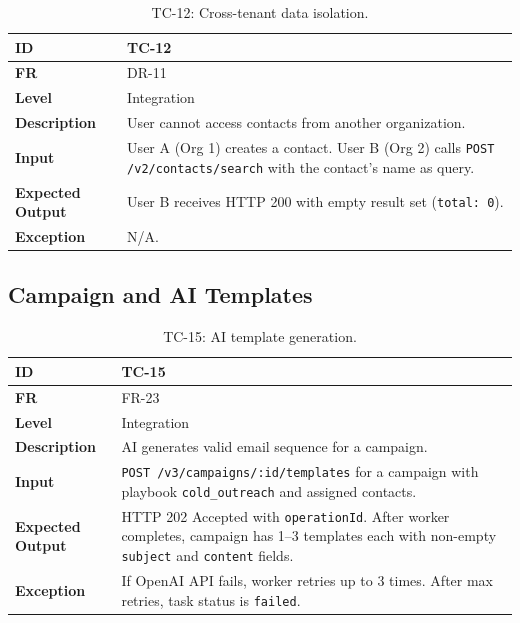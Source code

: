 \documentclass[a4paper]{article}
\begin{document}
\begin{table}[H]
\centering
\caption{TC-12: Cross-tenant data isolation.}
\begin{tabular}{|p{3cm}|p{10.5cm}|}
\hline
\textbf{ID} & TC-12 \\
\hline
\textbf{FR} & DR-11 \\
\hline
\textbf{Level} & Integration \\
\hline
\textbf{Description} & User cannot access contacts from another organization. \\
\hline
\textbf{Input} & User A (Org 1) creates a contact. User B (Org 2) calls \texttt{POST /v2/contacts/search} with the contact's name as query. \\
\hline
\textbf{Expected Output} & User B receives HTTP 200 with empty result set (\texttt{total: 0}). \\
\hline
\textbf{Exception} & N/A. \\
\hline
\end{tabular}
\small
\end{table}

\subsection{Campaign and AI Templates}

\begin{table}[H]
\centering
\caption{TC-15: AI template generation.}
\begin{tabular}{|p{3cm}|p{10.5cm}|}
\hline
\textbf{ID} & TC-15 \\
\hline
\textbf{FR} & FR-23 \\
\hline
\textbf{Level} & Integration \\
\hline
\textbf{Description} & AI generates valid email sequence for a campaign. \\
\hline
\textbf{Input} & \texttt{POST /v3/campaigns/:id/templates} for a campaign with playbook \texttt{cold\_outreach} and assigned contacts. \\
\hline
\textbf{Expected Output} & HTTP 202 Accepted with \texttt{operationId}. After worker completes, campaign has 1--3 templates each with non-empty \texttt{subject} and \texttt{content} fields. \\
\hline
\textbf{Exception} & If OpenAI API fails, worker retries up to 3 times. After max retries, task status is \texttt{failed}. \\
\hline
\end{tabular}
\small
\end{table}
\end{document}
